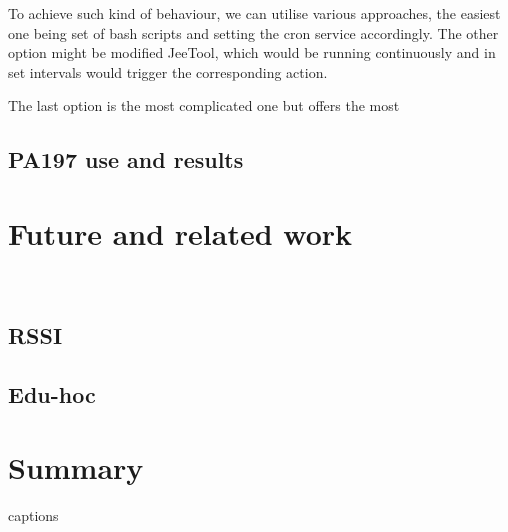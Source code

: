 \documentclass[
  print, %
  table,   %
  nolof,     %
  nolot,     %
           oneside
]{fithesis3}
\begin{document}
  To achieve such kind of behaviour, we can utilise various approaches, the easiest one being set of bash scripts and setting the cron service %
  accordingly. The other option might be modified JeeTool, which would be running continuously and in set intervals would trigger the corresponding action.

  The last option is the most complicated one but offers the most

  \section{PA197 use and results} \label{sec:PA197}

\chapter{Future and related work}\
  \section{RSSI}
  \section{Edu-hoc}
\chapter{Summary}




{\csname captions\languagename\endcsname %
\makeatletter %
  \thesis@selectLocale{\thesis@locale}\makeatother
\printbibliography[heading=bibintoc]} %

\appendix %
\end{document}
